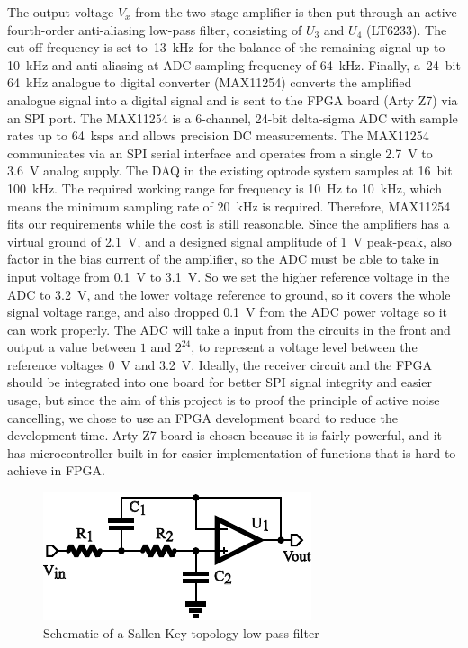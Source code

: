 The output voltage $V_x$ from the two-stage amplifier is then put through an active fourth-order anti-aliasing low-pass filter, consisting of $U_3$ and $U_4$ (LT6233).  The cut-off frequency is set to~\qty{13}{kHz} for the balance of the remaining signal up to \qty{10}{kHz} and anti-aliasing at ADC sampling frequency of \qty{64}{kHz}. Finally, a~\qty{24}{bit} \qty{64}{kHz} analogue to digital converter (MAX11254) converts the amplified analogue signal into a digital signal and is sent to the FPGA board (Arty Z7) via an SPI port.  The MAX11254 is a 6-channel, 24-bit delta-sigma ADC with sample rates up to \qty{64}{ksps} and allows precision DC measurements. The MAX11254 communicates via an SPI serial interface and operates from a single \qty{2.7}{V} to \qty{3.6}{V} analog supply.  The DAQ in the existing optrode system samples at \qty{16}{bit} \qty{100}{kHz}.  The required working range for frequency is \qty{10}{Hz} to \qty{10}{kHz}, which means the minimum sampling rate of \qty{20}{kHz} is required.  Therefore, MAX11254 fits our requirements while the cost is still reasonable.  Since the amplifiers has a virtual ground of \qty{2.1}{V}, and a designed signal amplitude of \qty{1}{V} peak-peak, also factor in the bias current of the amplifier, so the ADC must be able to take in input voltage from \qty{0.1}{V} to \qty{3.1}{V}.  So we set the higher reference voltage in the ADC to \qty{3.2}{V}, and the lower voltage reference to ground, so it covers the whole signal voltage range, and also dropped \qty{0.1}{V} from the ADC power voltage so it can work properly.  The ADC will take a input from the circuits in the front and output a value between $1$ and $2^{24}$, to represent a voltage level between the reference voltages \qty{0}{V} and \qty{3.2}{V}.  Ideally, the receiver circuit and the FPGA should be integrated into one board for better SPI signal integrity and easier usage, but since the aim of this project is to proof the principle of active noise cancelling, we chose to use an FPGA development board to reduce the development time.  Arty Z7 board is chosen because it is fairly powerful, and it has microcontroller built in for easier implementation of functions that is hard to achieve in FPGA.

\begin{figure}[H]
\centerline{\includegraphics[scale=1]{4-ANC_Sys/SallenKeyLPF.pdf}}
\caption{Schematic of a Sallen-Key topology low pass filter}
\label{fig_SallenKeyLPF}
\end{figure}

